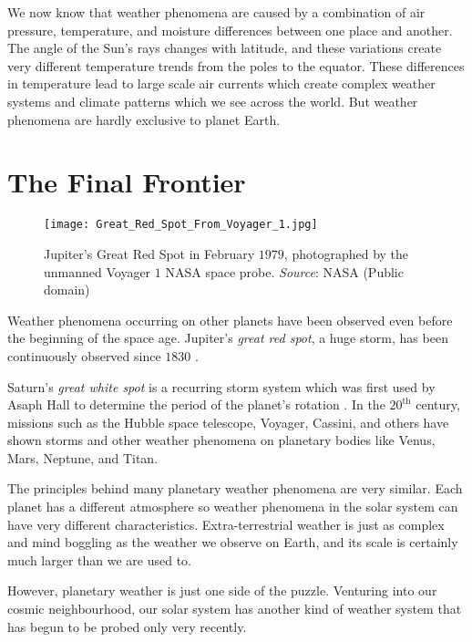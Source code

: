 We now know that weather phenomena are caused by a combination of air pressure, temperature, and 
moisture differences between one place and another. The angle of the Sun's rays changes with 
latitude, and these variations create very different temperature trends from the poles to the 
equator. These differences in temperature lead to large scale air currents which create complex 
weather systems and climate patterns which we see across the world. But weather phenomena are 
hardly exclusive to planet Earth.

\section*{The Final Frontier}

\begin{wrapfigure}{r}{0.35\textwidth}
    \centering\texttt{[image: Great\_Red\_Spot\_From\_Voyager\_1.jpg]}
    \caption{
        {\small 
            Jupiter's Great Red Spot in February $1979$, photographed by the unmanned 
            Voyager $1$ NASA space probe. \textit{Source}: NASA (Public domain)
        }
    }
    \label{fig:jupiter}
\end{wrapfigure}

Weather phenomena occurring on other planets have been observed even before the beginning of the 
space age. Jupiter's \emph{great red spot}, a huge storm, has been continuously observed since 
$1830$ \citetext{see \citealp{britannicaRedSpot}}.

Saturn's \emph{great white spot} is a recurring storm system which was first used by Asaph Hall to 
determine the period of the planet's rotation \citep{wikisaturn}. In the $20^{\text{th}}$ century, 
missions such as the Hubble space telescope, Voyager, Cassini, and others have shown storms and 
other weather phenomena on planetary bodies like Venus, Mars, Neptune, and Titan. 

The principles behind many planetary weather phenomena are very similar. Each planet has a 
different atmosphere so weather phenomena in the solar system can have very different 
characteristics. Extra-terrestrial weather is just as complex and mind boggling as the weather we 
observe on Earth, and its scale is certainly much larger than we are used to. 

However, planetary weather is just one side of the puzzle. Venturing into our cosmic neighbourhood, 
our solar system has another kind of weather system that has begun to be probed only very recently. 

